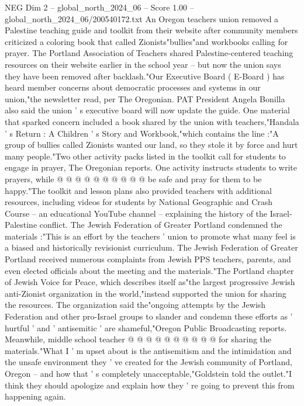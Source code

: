 \begin{textsample}{NEG Dim 2 – global\_north\_2024\_06 – Score 1.00 – global\_north\_2024\_06/200540172.txt}  \label{ex:f2_neg_189}
An Oregon teachers union removed a Palestine teaching guide and toolkit from their website after community members criticized a coloring book that called Zionists"bullies"and workbooks calling for prayer.
The Portland Association of Teachers shared Palestine-centered teaching resources on their website earlier in the school year -- but now the union says they have been removed after backlash."Our Executive Board ( E-Board ) has heard member concerns about democratic processes and systems in our union,"the newsletter read, per The Oregonian.
PAT President Angela Bonilla also said the union ' s executive board will now update the guide.
One material that sparked concern included a book shared by the union with teachers,"Handala ' s Return : A Children ' s Story and Workbook,"which contains the line :"A group of bullies called Zionists wanted our land, so they stole it by force and hurt many people."Two other activity packs listed in the toolkit call for students to engage in prayer, The Oregonian reports.
One activity instructs students to write prayers, while @ @ @ @ @ @ @ @ @ @ be safe and pray for them to be happy."The toolkit and lesson plans also provided teachers with additional resources, including videos for students by National Geographic and Crash Course -- an educational YouTube channel -- explaining the history of the Israel-Palestine conflict.
The Jewish Federation of Greater Portland condemned the materials :"This is an effort by the teachers ' union to promote what many feel is a biased and historically revisionist curriculum.
The Jewish Federation of Greater Portland received numerous complaints from Jewish PPS teachers, parents, and even elected officials about the meeting and the materials."The Portland chapter of Jewish Voice for Peace, which describes itself as"the largest progressive Jewish anti-Zionist organization in the world,"instead supported the union for sharing the resources.
The organization said the"ongoing attempts by the Jewish Federation and other pro-Israel groups to slander and condemn these efforts as ' hurtful ' and ' antisemitic ' are shameful,"Oregon Public Broadcasting reports.
Meanwhile, middle school teacher @ @ @ @ @ @ @ @ @ @ for sharing the materials."What I ' m upset about is the antisemitism and the intimidation and the unsafe environment they ' ve created for the Jewish community of Portland, Oregon -- and how that ' s completely unacceptable,"Goldstein told the outlet."I think they should apologize and explain how they ' re going to prevent this from happening again.

\end{textsample}
